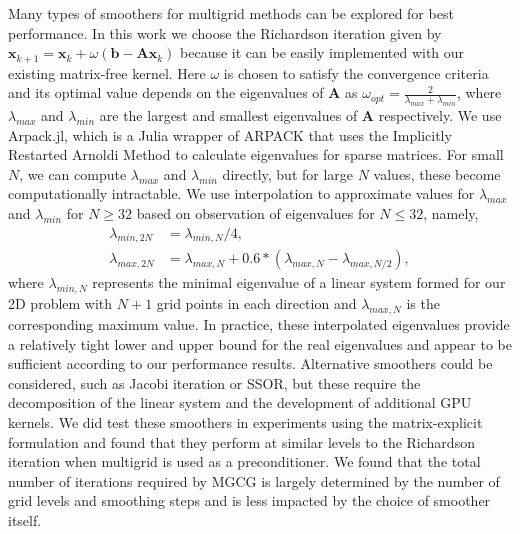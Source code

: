 Many types of smoothers for multigrid methods can be explored for best performance.  In this work we choose the Richardson iteration given by $\mathbf{x}_{k+1} = \mathbf{x}_k + \omega (\mathbf{b} - \mathbf{A}\mathbf{x}_k)$
because it can be easily implemented with our existing matrix-free kernel. Here $\omega$ is chosen to satisfy the convergence criteria and its optimal value depends on the eigenvalues of $\boldsymbol{A}$ as $\omega_{opt} = \frac{2}{\lambda_{max} + \lambda_{min}}$, where $\lambda_{max}$ and $\lambda_{min}$ are the largest and smallest eigenvalues of $\boldsymbol{A}$ respectively.
We use Arpack.jl, which is a Julia wrapper of ARPACK that uses the Implicitly Restarted Arnoldi Method to calculate eigenvalues for sparse matrices.
For small $N$, we can compute $\lambda_{max}$ and $\lambda_{min}$ directly, but for large $N$ values, these become computationally intractable. We use interpolation to approximate values for $\lambda_{max}$ and $\lambda_{min}$ for $N \geq 32$ based on observation of eigenvalues for $N \leq 32$, namely,
%
\begin{align*}
    \lambda_{min, 2N} &= \lambda_{min, N} / 4, \\
    \lambda_{max, 2N} &= \lambda_{max, N} + 0.6 * (\lambda_{max, N} - \lambda_{max, N/2}),
\end{align*}
where $\lambda_{min, N}$ represents the minimal eigenvalue of a linear system formed for our 2D problem with $N+1$ grid points in each direction and $\lambda_{max, N}$ is the corresponding maximum value.
In practice, these interpolated eigenvalues provide a relatively tight lower and upper bound for the real eigenvalues and appear to be sufficient according to our performance results.
Alternative smoothers could be considered, such as Jacobi iteration or SSOR, but these require the decomposition of the linear system and the development of additional GPU kernels. 
We did test these smoothers in experiments using the matrix-explicit formulation and found that they perform at similar levels to the Richardson iteration when multigrid is used as a preconditioner. We found that the total number of iterations required by MGCG is largely determined by the number of grid levels and smoothing steps and is less impacted by the choice of smoother itself. 
%

